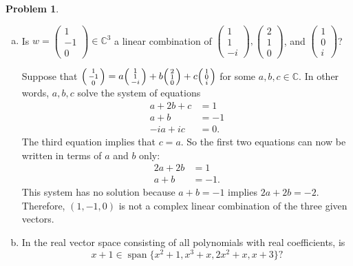 \documentclass[11pt,oneside]{amsart}
\theoremstyle{definition}
\newtheorem{problem}{Problem}
\newcommand{\bC}{\mathbb{C}}
\newcommand*\colvec[1]{\begin{psmallmatrix}#1\end{psmallmatrix}}
\newcommand*\dcolvec[1]{\begin{pmatrix}#1\end{pmatrix}}
\DeclareMathOperator{\Span}{span}
\begin{document}
    \begin{problem}
        \hfill \begin{enumerate}[(a)]
            \item Is $w=\dcolvec{1\\-1\\0}\in\bC^3$ a linear combination of $\begin{pmatrix}1\\1\\-i\end{pmatrix},\begin{pmatrix}2\\1\\0\end{pmatrix}$, and $\begin{pmatrix}1\\0\\i\end{pmatrix}$?
            \begin{solution}
                Suppose that $\colvec{1\\-1\\0}=a\colvec{1\\1\\-i}+b\colvec{2\\1\\0}+c\colvec{1\\0\\i}$ for some $a,b,c\in\bC$. In other words, $a,b,c$ solve the system of equations
                \begin{align*}
                    a+2b+c &= 1\\
                    a+b &= -1\\
                    -ia+ic &= 0.
                \end{align*}
                The third equation implies that $c=a$. So the first two equations can now be written in terms of $a$ and $b$ only:
                \begin{align*}
                    2a+2b &= 1\\
                    a+b &= -1.
                \end{align*}
                This system has no solution because $a+b=-1$ implies $2a+2b=-2$. Therefore, $(1,-1,0)$ is not a complex linear combination of the three given vectors.
            \end{solution}
            \item In the real vector space consisting of all polynomials with real coefficients, is
            \[x+1\in\Span\{x^2+1,x^3+x,2x^2+x,x+3\}?\]

\end{enumerate}
\end{problem}
\end{document}
